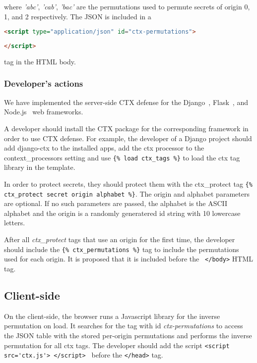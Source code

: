 \documentclass[a4paper, 11 pt, conference]{article}  %
\begin{document}
where \textit{'abc'}, \textit{'cab'}, \textit{'bac'} are the permutations used to permute secrets of origin 0, 1, and 2 respectively. The JSON is included in a
\begin{lstlisting}[language=HTML]
<script type="application/json" id="ctx-permutations">
\end{lstlisting}
\begin{lstlisting}[language=HTML]
</script>
\end{lstlisting} tag in the HTML body.

\subsubsection{Developer's actions}
We have implemented the server-side CTX defense for the Django~\cite{c13},
Flask~\cite{c14}, and Node.js~\cite{c15} web frameworks.

A developer should install the CTX package for the corresponding framework in
order to use CTX defense. For example, the developer of a Django project should
add django-ctx to the installed apps, add the ctx processor to the
context\_processors setting and use \lstinline|{% load ctx_tags %}| to load the ctx tag library in the template.

In order to protect secrets, they should protect them with the ctx\_protect tag \lstinline|{% ctx_protect secret origin alphabet %}|. The origin and alphabet parameters are optional. If no such parameters are passed, the alphabet is the ASCII alphabet and the origin is a randomly generatered id string with 10 lowercase letters.

After all \textit{ctx\_protect} tags that use an origin for the first time, the developer should include the \lstinline|{% ctx_permutations %}| tag to include the permutations used for each origin. It is proposed that it is included before the \lstinline| </body>| HTML tag.

\subsection{Client-side}
On the client-side, the browser runs a Javascript library for the inverse permutation on load. It searches for the tag with id \textit{ctx-permutations} to access the JSON table with the stored per-origin permutations and performs the inverse permutation for all ctx tags.
The developer should add the script \lstinline|<script src='ctx.js'> </script> | before the \lstinline|</head>| tag.
\end{document}
